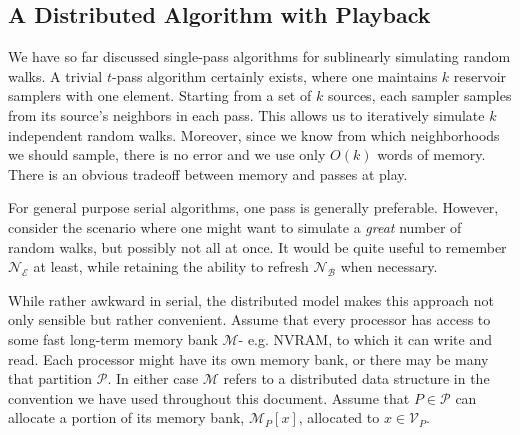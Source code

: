 \documentclass[10]{report}
\begin{document}
%
%



\subsection{A Distributed Algorithm with Playback}
 \label{walks:sec:walks:distributed:playback}

We have so far discussed single-pass algorithms for sublinearly simulating random walks. 
A trivial $t$-pass algorithm certainly exists, where one maintains $k$ reservoir samplers  with one element. 
Starting from a set of $k$ sources, each sampler samples from its source's neighbors in each pass. 
This allows us to iteratively simulate $k$ independent random walks. 
Moreover, since we know from which neighborhoods we should sample, there is no error and we use only $O(k)$ words of memory.
There is an obvious tradeoff between memory and passes at play.

For general purpose serial algorithms, one pass is generally preferable.
However, consider the scenario where one might want to simulate a \emph{great} number of random walks, but possibly not all at once.
It would be quite useful to remember $\mathcal{N}_\mathcal{E}$ at least, while retaining the ability to refresh $\mathcal{N}_\mathcal{B}$ when necessary.

While rather awkward in serial, the distributed model makes this approach not only sensible but rather convenient. 
Assume that every processor has access to some fast long-term memory bank $\mathcal{M}$- e.g. NVRAM, to which it can write and read.
Each processor might have its own memory bank, or there may be many that partition $\mathcal{P}$.
In either case $\mathcal{M}$ refers to a distributed data structure in the convention we have used throughout this document.
Assume that $P \in \mathcal{P}$ can allocate a portion of its memory bank, $\mathcal{M}_P[x]$, allocated to $x \in \mathcal{V}_P$.
\end{document}
